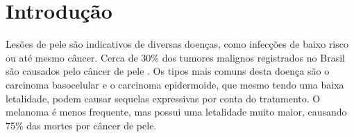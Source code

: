 \chapter{Introdução}



Lesões de pele são indicativos de diversas doenças, como infecções de baixo risco ou até mesmo câncer. Cerca de 30\% dos tumores malignos registrados no Brasil são
causados pelo câncer de pele \cite{skin_cancer_in_brazil}. Os tipos mais comuns desta doença são o carcinoma basocelular e o carcinoma epidermoide, que mesmo tendo uma
baixa letalidade, podem causar sequelas expressivas por conta do tratamento. O melanoma é menos frequente, mas possui uma letalidade muito maior, causando 75\% das mortes
por câncer de pele.



